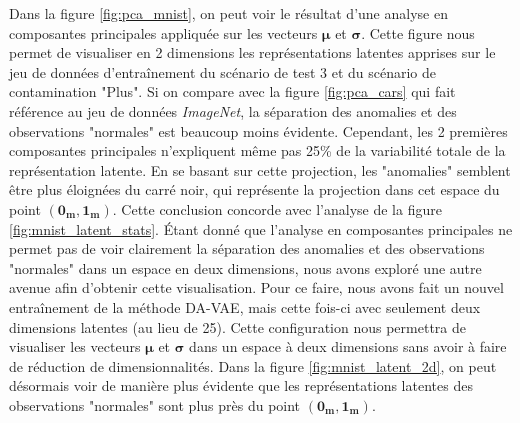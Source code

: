 Dans la figure \ref{fig:pca_mnist}, on peut voir le résultat d'une analyse en composantes principales appliquée sur les vecteurs $\boldsymbol{\mu}$ et $\boldsymbol{\sigma}$. Cette figure nous permet de visualiser en 2 dimensions les représentations latentes apprises sur le jeu de données d'entraînement du scénario de test 3 et du scénario de contamination "Plus". Si on compare avec la figure \ref{fig:pca_cars} qui fait référence au jeu de données \textit{ImageNet}, la séparation des anomalies et des observations "normales" est beaucoup moins évidente. Cependant, les 2 premières composantes principales n'expliquent même pas 25\% de la variabilité totale de la représentation latente. En se basant sur cette projection, les "anomalies" semblent être plus éloignées du carré noir, qui représente la projection dans cet espace du point $(\boldsymbol{0_{m}}, \boldsymbol{1_{m}})$. Cette conclusion concorde avec l'analyse de la figure \ref{fig:mnist_latent_stats}. Étant donné que l'analyse en composantes principales ne permet pas de voir clairement la séparation des anomalies et des observations "normales" dans un espace en deux dimensions, nous avons exploré une autre avenue afin d'obtenir cette visualisation. Pour ce faire, nous avons fait un nouvel entraînement de la méthode DA-VAE, mais cette fois-ci avec seulement deux dimensions latentes (au lieu de 25). Cette configuration nous permettra de visualiser les vecteurs $\boldsymbol{\mu}$ et $\boldsymbol{\sigma}$ dans un espace à deux dimensions sans avoir à faire de réduction de dimensionnalités. Dans la figure \ref{fig:mnist_latent_2d}, on peut désormais voir de manière plus évidente que les représentations latentes des observations "normales" sont plus près du point $(\boldsymbol{0_{m}}, \boldsymbol{1_{m}})$.


